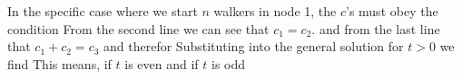 In the specific case where we start $n$ walkers in node 1, the $c$'s must obey the condition
From the second line we can see that $c_1=c_2$. and from the last line that $c_1+c_2=c_3$ and therefor 
Substituting into the general solution for $t>0$ we find
This means, if $t$ is even 
and if $t$ is odd 
